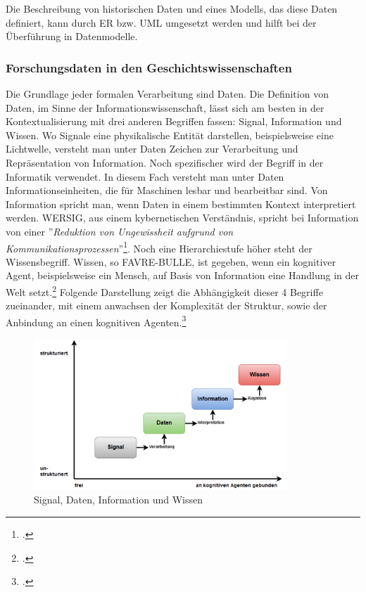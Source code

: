 \documentclass[12pt,a4paper]{article}
\begin{document}
Die Beschreibung von historischen Daten und eines Modells, das diese Daten definiert, kann durch ER bzw. UML umgesetzt werden und hilft bei der Überführung in Datenmodelle. 
\subsubsection{Forschungsdaten in den Geschichtswissenschaften}
\label{forschungdaten}

Die Grundlage jeder formalen Verarbeitung sind Daten. Die Definition von Daten, im Sinne der Informationswissenschaft, lässt sich am besten in der Kontextualisierung mit drei anderen Begriffen fassen: Signal, Information und Wissen. Wo Signale eine physikalische Entität darstellen, beispielsweise eine Lichtwelle, versteht man unter Daten Zeichen zur Verarbeitung und Repräsentation von Information. Noch spezifischer wird der Begriff in der Informatik verwendet. In diesem Fach versteht man unter Daten Informationseinheiten, die für Maschinen lesbar und bearbeitbar sind. Von Information spricht man, wenn Daten in einem bestimmten Kontext interpretiert werden. WERSIG, aus einem kybernetischen Verständnis, spricht bei Information von einer ''\textit{Reduktion von Ungewissheit aufgrund von Kommunikationsprozessen}''\footcite[][S.74]{wersig1971information}. Noch eine Hierarchiestufe höher steht der Wissensbegriff. Wissen, so FAVRE-BULLE, ist gegeben, wenn ein kognitiver Agent, beispielsweise ein Mensch, auf Basis von Information eine Handlung in der Welt setzt.\footcite[][S.93-97]{favre2001information} Folgende Darstellung zeigt die Abhängigkeit dieser 4 Begriffe zueinander, mit einem anwachsen der Komplexität der Struktur, sowie der Anbindung an einen kognitiven Agenten.\footcite[Eine ausführlichere Auseinandersetzung mit den Begriffen Daten, Information und Wissen findet sich in meiner ersten Abschlussarbeit.][Masterarbeit Graz, S.20-28]{pollin2017suchen}
\begin{figure}[H]
\centering
	\includegraphics[width=0.85\textwidth]{img/daten.png}  
    \caption[Signal, Daten, Information und Wissen. POLLIN Christopher: Vom Suchen, Stöbern und Finden : Information Retrieval am Beispiel der Digitalen Sammlung des Hans Gross Kriminalmuseums, Masterarbeit Graz, S.21 ]{Signal, Daten, Information und Wissen} \label{fig:daten}
\end{figure} 
\end{document}
